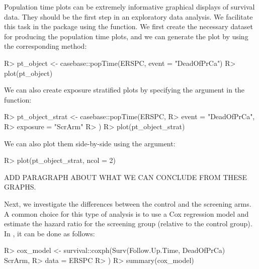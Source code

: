 \documentclass[
]{jss}
\begin{document}
Population time plots can be extremely informative graphical displays of
survival data. They should be the first step in an exploratory data
analysis. We facilitate this task in the  package using
the  function. We first create the necessary dataset for
producing the population time plots, and we can generate the plot by
using the corresponding  method:

\begin{CodeChunk}

\begin{CodeInput}
R> pt_object <- casebase::popTime(ERSPC, event = "DeadOfPrCa")
R> plot(pt_object)
\end{CodeInput}
\end{CodeChunk}

We can also create exposure stratified plots by specifying the
 argument in the  function:

\begin{CodeChunk}

\begin{CodeInput}
R> pt_object_strat <- casebase::popTime(ERSPC,
R>   event = "DeadOfPrCa",
R>   exposure = "ScrArm"
R> )
R> plot(pt_object_strat)
\end{CodeInput}
\end{CodeChunk}

We can also plot them side-by-side using the  argument:

\begin{CodeChunk}

\begin{CodeInput}
R> plot(pt_object_strat, ncol = 2)
\end{CodeInput}
\end{CodeChunk}

ADD PARAGRAPH ABOUT WHAT WE CAN CONCLUDE FROM THESE GRAPHS.

Next, we investigate the differences between the control and the
screening arms. A common choice for this type of analysis is to use a
Cox regression model and estimate the hazard ratio for the screening
group (relative to the control group). In , it can be done
as follows:

\begin{CodeChunk}

\begin{CodeInput}
R> cox_model <- survival::coxph(Surv(Follow.Up.Time, DeadOfPrCa) ~ ScrArm,
R>   data = ERSPC
R> )
R> summary(cox_model)
\end{CodeInput}
\end{CodeChunk}
\end{document}
